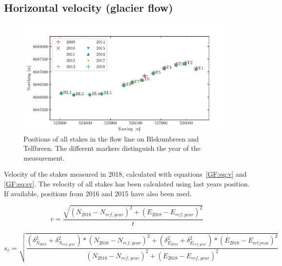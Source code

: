 \subsection{Horizontal velocity (glacier flow)}

\begin{figure}[H]
    \centering
    \includegraphics[width=\textwidth]{./figs/stakePositions.pdf}
    \caption{Positions of all stakes in the flow line on Blekumbreen and Tellbreen.
    The different markers distinguish the year of the measurement.}
    \label{GF:fig:stakepos}
\end{figure}






\begin{table}[h]
	\caption{Velocity of the stakes measured in 2018, calculated with equations~\ref{GF:eq:v} and \ref{GF:eq:sv}.
	The velocity of all stakes has been calculated using last years position.
	If available, positions from 2016 and 2015 have also been used.}
	\centering
	
	\label{GPS:tab:os_tab}
\end{table}

\begin{equation}
\label{GF:eq:v}
v = \frac{\sqrt{(N_{2018}-N_{ref,year})^2+(E_{2018} - E_{ref,year})^2}}{t}
\end{equation}

\begin{equation}
\label{GF:eq:sv}
s_v = \sqrt{\frac{(\delta_{N_{2018}}^2 + \delta_{N_{ref,year}}^2) * (N_{2018}-N_{ref,year})^2 +
(\delta_{E_{2018}}^2 + \delta_{E_{ref,year}}^2) * (E_{2018}-E_{\text{ref,year}})^2}
{(N_{2018} - N_{ref,year})^2+ (E_{2018} - E_{ref,year})^2}}
\end{equation}


